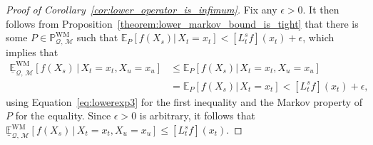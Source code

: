 \documentclass[10pt,a4paper]{paper}
\theoremstyle{definition}
\newcommand{\reals}{\mathbb{R}}
\newcommand{\realspos}{\reals_{>0}}
\newcommand{\processes}{\mathbb{P}}
\newcommand{\wprocesses}{\processes^{\mathrm{W}}}
\newcommand{\wmprocesses}{\processes^{\mathrm{WM}}}
\newcommand{\rateset}{\mathcal{Q}}
\newcommand{\norm}[1]{\left\lVert #1 \right\rVert}
\begin{document}
\begin{proof}[Proof of Corollary~\ref{cor:lower_operator_is_infimum}]
Fix any $\epsilon>0$.
It then follows from Proposition~\ref{theorem:lower_markov_bound_is_tight} that there is some $P\in\wmprocesses_{\rateset,\,\mathcal{M}}$ such that $\mathbb{E}_P[f(X_s)\vert\,X_t=x_t] < [L_t^sf](x_t)+\epsilon$, which implies that
\begin{align*}
\underline{\mathbb{E}}^{\mathrm{WM}}_{\rateset,\,\mathcal{M}}\left[f(X_s)\,\vert\,X_t=x_t,X_u=x_u\right]
&\leq
\mathbb{E}_P[f(X_s)\vert\,X_t=x_t,X_u=x_u]\\
&=\mathbb{E}_P[f(X_s)\vert\,X_t=x_t]
< [L_t^sf](x_t)+\epsilon,
\end{align*}
using Equation~\eqref{eq:lowerexp3} for the first inequality and the Markov property of $P$ for the equality. Since $\epsilon>0$ is arbitrary, it follows that  $\underline{\mathbb{E}}^{\mathrm{WM}}_{\rateset,\,\mathcal{M}}\left[f(X_s)\,\vert\,X_t=x_t,X_u=x_u\right]\leq[L_t^sf](x_t)$.

\end{proof}
\end{document}
